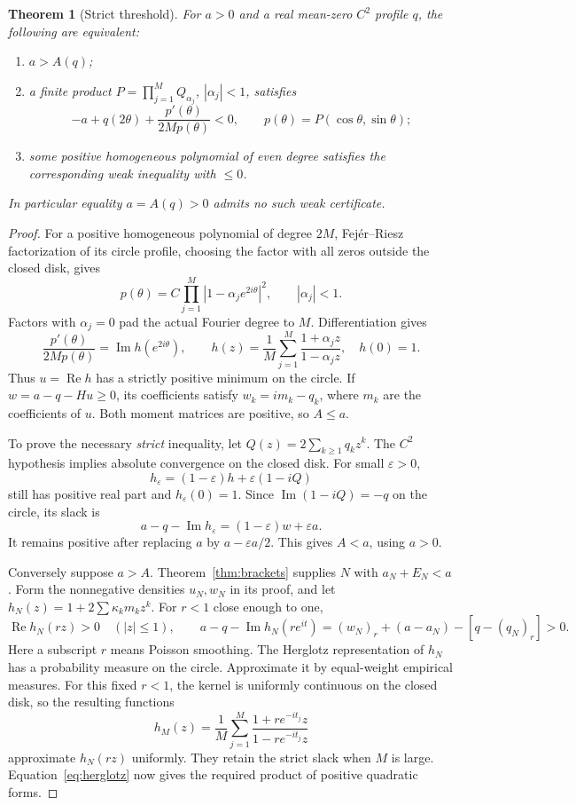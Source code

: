 \documentclass[11pt,a4paper]{article}
\newtheorem{theorem}{Theorem}[section]
\theoremstyle{remark}\newtheorem{remark}[theorem]{Remark}
\newcommand{\Rea}{\operatorname{Re}}
\newcommand{\Ima}{\operatorname{Im}}
\begin{document}
\begin{theorem}[Strict threshold]\label{thm:threshold}
For \(a>0\) and a real mean-zero \(C^2\) profile \(q\), the following
are equivalent:
\begin{enumerate}[label=(\roman*)]
\item \(a>A(q)\);
\item a finite product \(P=\prod_{j=1}^M Q_{\alpha_j}\),
      \(|\alpha_j|<1\), satisfies
\[
  -a+q(2\theta)+\frac{p'(\theta)}{2M p(\theta)}<0,
  \qquad p(\theta)=P(\cos\theta,\sin\theta);
\]
\item some positive homogeneous polynomial of even degree satisfies
      the corresponding weak inequality with \(\leq0\).
\end{enumerate}
In particular equality \(a=A(q)>0\) admits no such weak certificate.
\end{theorem}

\begin{proof}
For a positive homogeneous polynomial of degree \(2M\),
Fej\'er--Riesz factorization of its circle profile, choosing the
factor with all zeros outside the closed disk, gives
\[
 p(\theta)=C\prod_{j=1}^M|1-\alpha_j e^{2i\theta}|^2,
 \qquad |\alpha_j|<1.
\]
Factors with \(\alpha_j=0\) pad the actual Fourier degree to \(M\).
Differentiation gives
\begin{equation}\label{eq:herglotz}
 \frac{p'(\theta)}{2M p(\theta)}
 =\Ima h(e^{2i\theta}),\qquad
 h(z)=\frac1M\sum_{j=1}^M\frac{1+\alpha_jz}{1-\alpha_jz},
 \quad h(0)=1.
\end{equation}
Thus \(u=\Rea h\) has a strictly positive minimum on the circle.
If \(w=a-q-Hu\geq0\), its coefficients satisfy
\(w_k=i m_k-q_k\), where \(m_k\) are the coefficients of \(u\).
Both moment matrices are positive, so \(A\leq a\).

To prove the necessary \emph{strict} inequality, let
\(Q(z)=2\sum_{k\geq1}q_kz^k\). The \(C^2\) hypothesis implies
absolute convergence on the closed disk. For small \(\varepsilon>0\),
\[
 h_\varepsilon=(1-\varepsilon)h+\varepsilon(1-iQ)
\]
still has positive real part and \(h_\varepsilon(0)=1\).
Since \(\Ima(1-iQ)=-q\) on the circle, its slack is
\[
 a-q-\Ima h_\varepsilon=(1-\varepsilon)w+\varepsilon a.
\]
It remains positive after replacing \(a\) by
\(a-\varepsilon a/2\). This gives \(A<a\), using \(a>0\).

Conversely suppose \(a>A\). Theorem~\ref{thm:brackets} supplies
\(N\) with \(a_N+E_N<a\). Form the nonnegative densities \(u_N,w_N\)
in its proof, and let \(h_N(z)=1+2\sum\kappa_km_kz^k\).
For \(r<1\) close enough to one,
\[
 \Rea h_N(rz)>0\quad(|z|\leq1),\qquad
 a-q-\Ima h_N(re^{it})
 =(w_N)_r+(a-a_N)-[q-(q_N)_r]>0.
\]
Here a subscript \(r\) means Poisson smoothing.
The Herglotz representation of \(h_N\) has a probability measure
on the circle. Approximate it by equal-weight empirical measures.
For this fixed \(r<1\), the kernel is uniformly continuous on the
closed disk, so the resulting functions
\[
 h_M(z)=\frac1M\sum_{j=1}^M
        \frac{1+r e^{-it_j}z}{1-r e^{-it_j}z}
\]
approximate \(h_N(rz)\) uniformly. They retain the strict slack
when \(M\) is large. Equation~\eqref{eq:herglotz} now gives the
required product of positive quadratic forms.
\end{proof}
\end{document}
